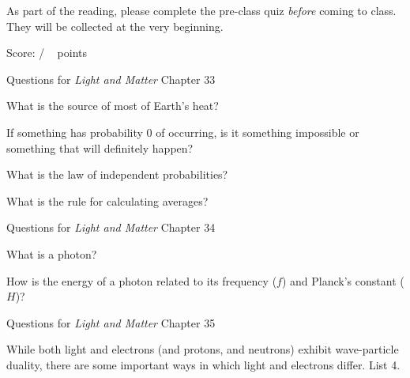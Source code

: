 \documentclass[addpoints,12pt]{exam}
\begin{document}
As part of the reading, please complete the pre-class quiz \textit{before} coming to class. They will be collected at the very beginning.
 
\clearpage

\begin{flushright}
Score: \hspace{0.2in} / \numpoints ~ points
\end{flushright}


\noindent Questions for \textit{Light and Matter} Chapter 33

\begin{questions}

\question[1]
What is the source of most of Earth's heat?
\fillwithlines{0.5in}

\question[1]
If something has probability 0 of occurring, is it something impossible or something that will definitely happen?
\fillwithlines{0.5in}

\question[1]
What is the law of independent probabilities?
\fillwithlines{1in}

\question[1]
What is the rule for calculating averages?
\fillwithlines{1in}

\end{questions}


\noindent Questions for \textit{Light and Matter} Chapter 34

\begin{questions}

\question[1]
What is a photon?
\fillwithlines{0.5in}

\question[1]
How is the energy of a photon related to its frequency ($f$) and Planck's constant ($H$)?
\fillwithlines{0.5in}

\end{questions}

\noindent Questions for \textit{Light and Matter} Chapter 35

\begin{questions}

\question[4]
While both light and electrons (and protons, and neutrons) exhibit wave-particle duality, there are some important ways in which light and electrons differ. List 4.
\fillwithlines{1in}


\end{questions}
\end{document}
